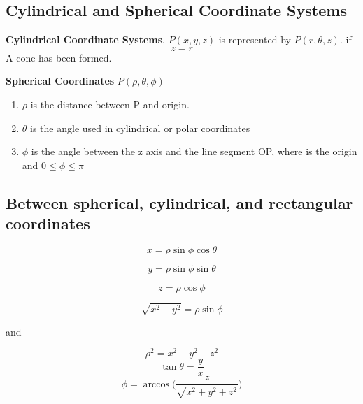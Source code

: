 \subsection{Cylindrical and Spherical Coordinate Systems}

\textbf{Cylindrical Coordinate Systems}, $P(x,y,z)$ is represented by $P(r,\theta,z)$.
if
\begin{equation}
	\label{}
z=r	
\end{equation}
A cone has been formed.

\textbf{Spherical Coordinates}
$P(\rho,\theta,\phi)$
\begin{enumerate}
	\item $\rho$ is the distance between P and origin.
	\item $\theta$ is the angle used in cylindrical or polar coordinates
	\item $\phi$ is the angle between the z axis and the line segment OP, where  is the origin and $0\leq\phi\leq\pi$
\end{enumerate}

\subsection{Between spherical, cylindrical, and rectangular coordinates}

\begin{equation}
	\label{}
x=\rho\sin\phi\cos\theta	
\end{equation}


\begin{equation}
	\label{}
y=\rho\sin\phi\sin\theta	
\end{equation}

\begin{equation}
	\label{}
z=\rho\cos\phi	
\end{equation}

\begin{equation}
	\label{}
	\sqrt{x^{2}	+y^{2}}=\rho\sin\phi
\end{equation}


and

\begin{equation}
	\label{}
	\rho^{2}=x^{2}+y^{2}+z^{2}
\end{equation}
\begin{equation}
	\label{}
\tan\theta=\frac{y}{x}	
\end{equation}
\begin{equation}
	\label{}
	\phi=\arccos\big(\frac{z}{\sqrt{x^{2}+y^{2}+z^{2}}}	\big)
\end{equation}

